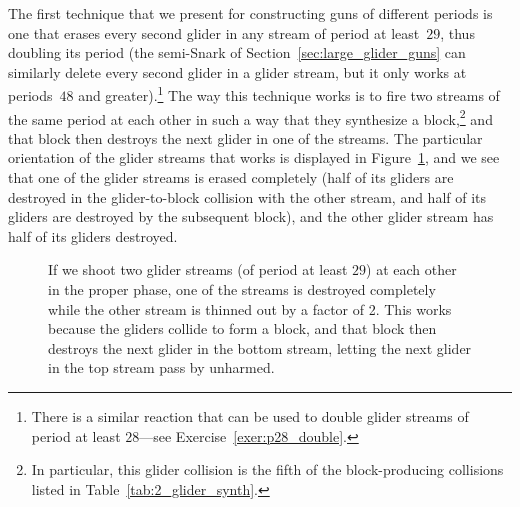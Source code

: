 The first technique that we present for constructing guns of different periods is one that erases every second glider in any stream of period at least~$29$, thus doubling its period (the semi-Snark of Section~\ref{sec:large_glider_guns} can similarly delete every second glider in a glider stream, but it only works at periods~$48$ and greater).\footnote{There is a similar reaction that can be used to double glider streams of period at least $28$---see Exercise~\ref{exer:p28_double}.} The way this technique works is to fire two streams of the same period at each other in such a way that they synthesize a block,\footnote{In particular, this glider collision is the fifth of the block-producing collisions listed in Table~\ref{tab:2_glider_synth}.} and that block then destroys the next glider in one of the streams. The particular orientation of the glider streams that works is displayed in Figure~\ref{fig:glider_delete}, and we see that one of the glider streams is erased completely (half of its gliders are destroyed in the glider-to-block collision with the other stream, and half of its gliders are destroyed by the subsequent block), and the other glider stream has half of its gliders destroyed.
\begin{figure}[!htb]
	\centering
	\caption{If we shoot two glider streams (of period at least $29$) at each other in the proper phase, one of the streams is destroyed completely while the other stream is thinned out by a factor of 2. This works because the gliders collide to form a block, and that block then destroys the next glider in the bottom stream, letting the next glider in the top stream pass by unharmed.}\label{fig:glider_delete}
\end{figure}

